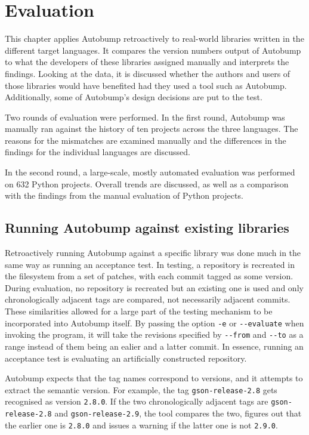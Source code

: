 \documentclass{l4proj}
\newcommand\genericstyle{\lstset{basicstyle=\ttm}}
\newcommand\codeinline[1]{{\genericstyle\lstinline!#1!}}
\begin{document}
\chapter{Evaluation}
\label{Evaluation}

This chapter applies Autobump retroactively to real-world libraries
written in the different target languages. It compares the version
numbers output of Autobump to what the developers of these libraries
assigned manually and interprets the findings. Looking at the data, it
is discussed whether the authors and users of those libraries would
have benefited had they used a tool such as Autobump. Additionally,
some of Autobump's design decisions are put to the test.

Two rounds of evaluation were performed. In the first round, Autobump
was manually ran against the history of ten projects across the
three languages. The reasons for the mismatches are examined manually
and the differences in the findings for the individual languages are
discussed.

In the second round, a large-scale, mostly automated evaluation was
performed on 632 Python projects. Overall trends are discussed, as
well as a comparison with the findings from the manual evaluation of
Python projects.

\section{Running Autobump against existing libraries}

Retroactively running Autobump against a specific library was done
much in the same way as running an acceptance test. In testing, a
repository is recreated in the filesystem from a set of patches, with
each commit tagged as some version. During evaluation, no repository
is recreated but an existing one is used and only chronologically
adjacent tags are compared, not necessarily adjacent commits. These
similarities allowed for a large part of the testing mechanism to be
incorporated into Autobump itself. By passing the option
\codeinline{-e} or \codeinline{--evaluate} when invoking the program,
it will take the revisions specified by \codeinline{--from} and
\codeinline{--to} as a range instead of them being an ealier and a
latter commit. In essence, running an acceptance test is evaluating an
artificially constructed repository.

Autobump expects that the tag names correspond to versions, and it
attempts to extract the semantic version. For example, the tag
\codeinline{gson-release-2.8} gets recognised as version
\codeinline{2.8.0}. If the two chronologically adjacent tags are
\codeinline{gson-release-2.8} and \codeinline{gson-release-2.9}, the
tool compares the two, figures out that the earlier one is
\codeinline{2.8.0} and issues a warning if the latter one is not
\codeinline{2.9.0}.
\end{document}
